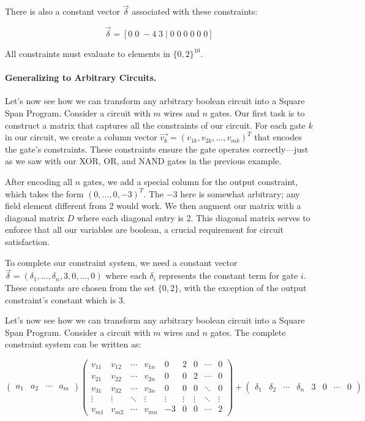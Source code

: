 There is also a constant vector $\vec{\delta}$ associated with these constraints:

\[ \vec{\delta} = [0 \; 0 \; -4 \; 3 \; | \; 0 \; 0 \; 0 \; 0 \; 0 \; 0] \]

All constraints must evaluate to elements in $\{0, 2\}^{10}$. 

\paragraph{Generalizing to Arbitrary Circuits.}

Let's now see how we can transform any arbitrary boolean circuit into a Square Span Program. Consider a circuit with $m$ wires and $n$ gates. Our first task is to construct a matrix that captures all the constraints of our circuit. For each gate $k$ in our circuit, we create a column vector $\vec{v_k} = (v_{1k}, v_{2k}, \ldots, v_{mk})^T$ that encodes the gate's constraints. These constraints ensure the gate operates correctly—just as we saw with our XOR, OR, and NAND gates in the previous example.

After encoding all $n$ gates, we add a special column for the output constraint, which takes the form $(0,\ldots,0,-3)^T$. The $-3$ here is somewhat arbitrary; any field element different from 2 would work. We then augment our matrix with a diagonal matrix $D$ where each diagonal entry is 2. This diagonal matrix serves to enforce that all our variables are boolean, a crucial requirement for circuit satisfaction.

To complete our constraint system, we need a constant vector $\vec{\delta} = (\delta_1,\ldots,\delta_n,3,0,\ldots,0)$ where each $\delta_i$ represents the constant term for gate $i$. These constants are chosen from the set $\{0,2\}$, with the exception of the output constraint's constant which is 3.

Let's now see how we can transform any arbitrary boolean circuit into a Square Span Program. Consider a circuit with $m$ wires and $n$ gates. The complete constraint system can be written as:

\[ \begin{pmatrix} a_1 & a_2 & \cdots & a_m \end{pmatrix}
\begin{pmatrix}
v_{11} & v_{12} & \cdots & v_{1n} & 0 & 2 & 0 & \cdots & 0 \\
v_{21} & v_{22} & \cdots & v_{2n} & 0 & 0 & 2 & \cdots & 0 \\
v_{31} & v_{32} & \cdots & v_{3n} & 0 & 0 & 0 & \ddots & 0 \\
\vdots & \vdots & \ddots & \vdots & \vdots & \vdots & \vdots & \ddots & \vdots \\
v_{m1} & v_{m2} & \cdots & v_{mn} & -3 & 0 & 0 & \cdots & 2
\end{pmatrix} + \begin{pmatrix} \delta_1 & \delta_2 & \cdots & \delta_n & 3 & 0 & \cdots & 0 \end{pmatrix} \]

